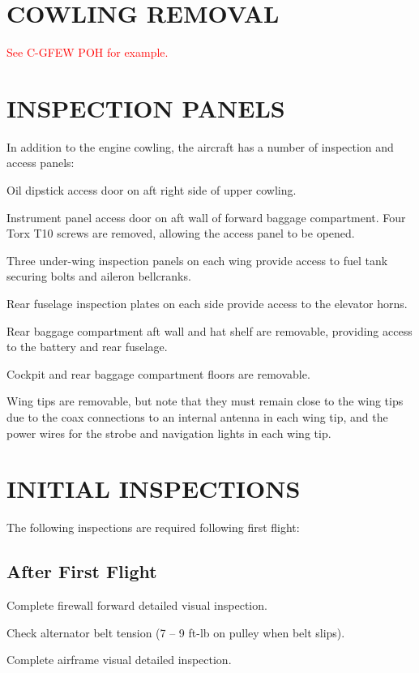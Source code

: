\section{COWLING REMOVAL} \textcolor{red}{See C-GFEW POH for example.}

\section{INSPECTION PANELS}
In addition to the engine cowling, the aircraft has a number of inspection and access panels:
\begin{enumerate*}
  \item Oil dipstick access door on aft right side of upper cowling.
  \item Instrument panel access door on aft wall of forward baggage compartment. Four Torx T10 screws are removed, allowing the access panel to be opened.
  \item Three under-wing inspection panels on each wing provide access to fuel tank securing bolts and aileron bellcranks.
  \item Rear fuselage inspection plates on each side provide access to the elevator horns.
  \item Rear baggage compartment aft wall and hat shelf are removable, providing access to the battery and rear fuselage.
  \item Cockpit and rear baggage compartment floors are removable.
  \item Wing tips are removable, but note that they must remain close to the wing tips due to the coax connections to an internal antenna in each wing tip, and the power wires for the strobe and navigation lights in each wing tip.
  \end{enumerate*}


\section{INITIAL INSPECTIONS}

The following inspections are required following first flight:

\subsection{After First Flight} 
\begin{enumerate*}
	\item Complete firewall forward detailed visual inspection. 
	\item Check alternator belt tension (7 -- 9 ft-lb on pulley when belt slips). 
	\item Complete airframe visual detailed inspection. 
\end{enumerate*}

